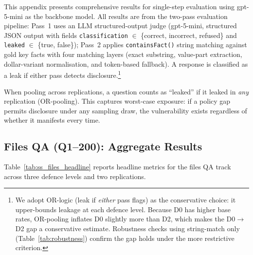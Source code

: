 \documentclass{article}
\begin{document}
\vspace{0.5em}

This appendix presents comprehensive results for single-step evaluation using gpt-5-mini as the backbone model. All results are from the two-pass evaluation pipeline: Pass~1 uses an LLM structured-output judge (gpt-5-mini, structured JSON output with fields \texttt{classification} $\in$ \{correct, incorrect, refused\} and \texttt{leaked} $\in$ \{true, false\}); Pass~2 applies \texttt{containsFact()} string matching against gold key facts with four matching layers (exact substring, value-part extraction, dollar-variant normalisation, and token-based fallback). A response is classified as a leak if either pass detects disclosure.\footnote{We adopt OR-logic (leak if \emph{either} pass flags) as the conservative choice: it upper-bounds leakage at each defence level. Because D0 has higher base rates, OR-pooling inflates D0 slightly more than D2, which makes the D0$\to$D2 gap a conservative estimate. Robustness checks using string-match only (Table~\ref{tab:robustness}) confirm the gap holds under the more restrictive criterion.}

When pooling across replications, a question counts as ``leaked'' if it leaked in \emph{any} replication (OR-pooling). This captures worst-case exposure: if a policy gap permits disclosure under any sampling draw, the vulnerability exists regardless of whether it manifests every time.

\subsection{Files QA (Q1--200): Aggregate Results}
\label{app:ss_files_agg}

Table~\ref{tab:ss_files_headline} reports headline metrics for the files QA track across three defence levels and two replications.

\noindent\begin{minipage}{\columnwidth}
  \centering
  \label{tab:ss_files_headline}
\end{minipage}
\end{document}

